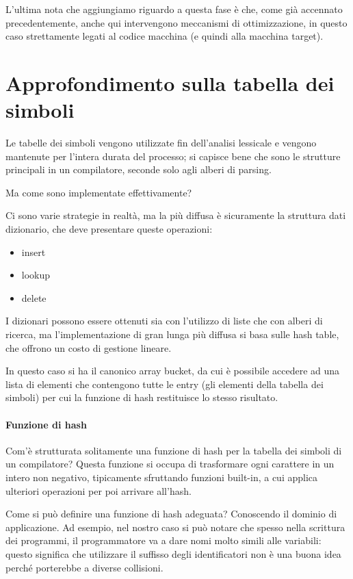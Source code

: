 \documentclass[class=book, crop=false, oneside, 12pt]{standalone}
\begin{document}
L'ultima nota che aggiungiamo riguardo a questa fase è che, come già accennato precedentemente, anche qui intervengono meccanismi di ottimizzazione, in questo caso strettamente legati al codice macchina (e quindi alla macchina target).

\section{Approfondimento sulla tabella dei simboli}
Le tabelle dei simboli vengono utilizzate fin dell'analisi lessicale e vengono mantenute per l'intera durata del processo; si capisce bene che sono le strutture principali in un compilatore, seconde solo agli alberi di parsing.

Ma come sono implementate effettivamente? 

Ci sono varie strategie in realtà, ma la più diffusa è sicuramente la struttura dati dizionario, che deve presentare queste operazioni:
\begin{itemize}
    \item insert
    \item lookup
    \item delete
\end{itemize}
I dizionari possono essere ottenuti sia con l'utilizzo di liste che con alberi di ricerca, ma l'implementazione di gran lunga più diffusa si basa sulle hash table, che offrono un costo di gestione lineare.

In questo caso si ha il canonico array bucket, da cui è possibile accedere ad una lista di elementi che contengono tutte le entry (gli elementi della tabella dei simboli) per cui la funzione di hash restituisce lo stesso risultato.

\paragraph{Funzione di hash} Com'è strutturata solitamente una funzione di hash per la tabella dei simboli di un compilatore?
Questa funzione si occupa di trasformare ogni carattere in un intero non negativo, tipicamente sfruttando funzioni built-in, a cui applica ulteriori operazioni per poi arrivare all'hash.

Come si può definire una funzione di hash adeguata?
Conoscendo il dominio di applicazione. Ad esempio, nel nostro caso si può notare che spesso nella scrittura dei programmi, il programmatore va a dare nomi molto simili alle variabili: questo significa che utilizzare il suffisso degli identificatori non è una buona idea perché porterebbe a diverse collisioni.
\end{document}
